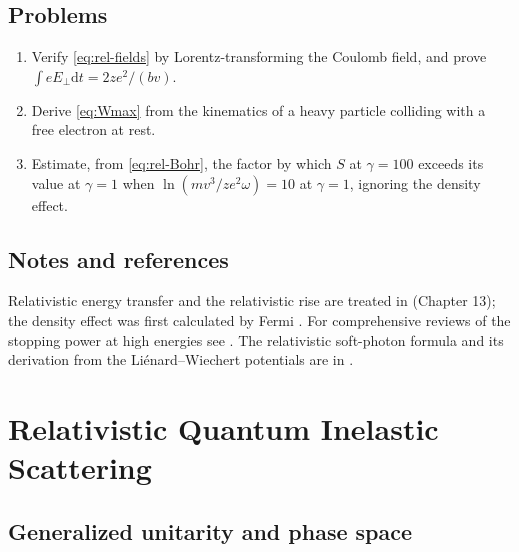 \documentclass[11pt,a4paper]{book}
\numberwithin{equation}{chapter}
\newcommand{\dd}{\mathrm{d}}
\begin{document}
\section{Problems}
\begin{enumerate}
  \item Verify \eqref{eq:rel-fields} by Lorentz-transforming the Coulomb field,
        and prove $\int eE_\perp\dd t=2ze^2/(bv)$.
  \item Derive \eqref{eq:Wmax} from the kinematics of a heavy particle colliding
        with a free electron at rest.
  \item Estimate, from \eqref{eq:rel-Bohr}, the factor by which $S$ at $\gamma=100$
        exceeds its value at $\gamma=1$ when $\ln(mv^3/ze^2\omega)=10$ at
        $\gamma=1$, ignoring the density effect.
\end{enumerate}

\section*{Notes and references}
Relativistic energy transfer and the relativistic rise are treated in \cite{Jackson} (Chapter 13); the density effect was first calculated by Fermi \cite{Fermi40}. For comprehensive reviews of the stopping power at high energies see \cite{Sigmund,PDG}. The relativistic soft-photon formula and its derivation from the Li\'enard--Wiechert potentials are in \cite{Jackson,LL2}.

\chapter{Relativistic Quantum Inelastic Scattering}

\section{Generalized unitarity and phase space}
\end{document}
